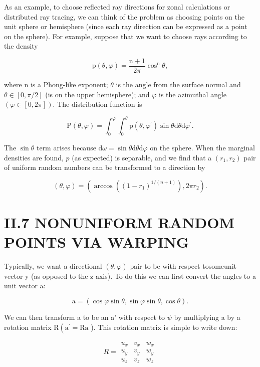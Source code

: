 \begin{CJK}{UTF8}{gbsn}
As an example, to choose reflected ray directions for zonal calculations or distributed ray tracing, we can think of the problem as choosing points on the unit sphere or hemisphere (since each ray direction can be expressed as a point on the sphere). For example, suppose that we want to choose rays according to the density

$$
\mathrm{p}(\theta, \varphi)=\frac{\mathrm{n}+1}{2 \pi} \cos ^{\mathrm{n}} \theta,
$$

where $\mathrm{n}$ is a Phong-like exponent; $\theta$ is the angle from the surface normal and $\theta \in[0, \pi / 2]$ (is on the upper hemisphere); and $\varphi$ is the azimuthal angle $(\varphi \in[0,2 \pi])$. The distribution function is

$$
\mathrm{P}(\theta, \varphi)=\int_{0}^{\varphi} \int_{0}^{\theta} \mathrm{p}\left(\theta, \varphi^{\prime}\right) \sin \theta \mathrm{d} \theta \mathrm{d} \varphi^{\prime} .
$$

The $\sin \theta$ term arises because $\mathrm{d} \omega=\sin \theta \mathrm{d} \theta \mathrm{d} \varphi$ on the sphere. When the marginal densities are found, $p$ (as expected) is separable, and we find that a $\left(r_{1}, r_{2}\right)$ pair of uniform random numbers can be transformed to a direction by

$$
(\theta, \varphi)=\left(\arccos \left(\left(1-r_{1}\right)^{1 /(n+1)}\right), 2 \pi r_{2}\right) .
$$

\section{II.7 NONUNIFORM RANDOM POINTS VIA WARPING}
Typically, we want a directional $(\theta, \varphi)$ pair to be with respect tosomeunit vector $\mathrm{y}$ (as opposed to the $\mathrm{z}$ axis). To do this we can first convert the angles to a unit vector a:

$$
\mathrm{a}=(\cos \varphi \sin \theta, \sin \varphi \sin \theta, \cos \theta) .
$$

We can then transform a to be an a' with respect to $\psi$ by multiplying a by a rotation matrix $\mathrm{R}\left(\mathrm{a}^{\prime}=\mathrm{Ra}\right.$ ). This rotation matrix is simple to write down:

$$
R=\begin{array}{lll}
u_{x} & v_{x} & w_{x} \\
u_{y} & v_{y} & w_{y} \\
u_{z} & v_{z} & w_{z}
\end{array}
$$


\end{CJK}
